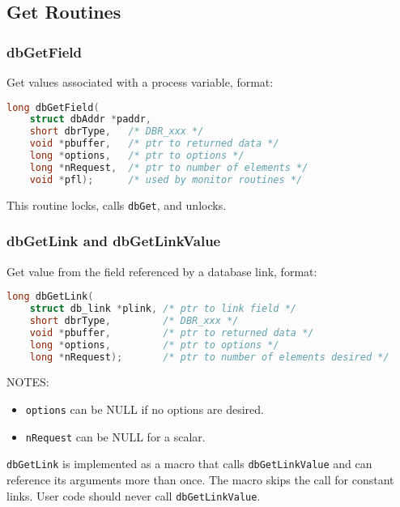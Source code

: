 \subsection{Get Routines}

\subsubsection{dbGetField}

Get values associated with a process variable, format:

\begin{lstlisting}[language=C]
long dbGetField(
    struct dbAddr *paddr,
    short dbrType,   /* DBR_xxx */
    void *pbuffer,   /* ptr to returned data */
    long *options,   /* ptr to options */
    long *nRequest,  /* ptr to number of elements */
    void *pfl);      /* used by monitor routines */
\end{lstlisting}

This routine locks, calls \verb|dbGet|, and unlocks.

\subsubsection{dbGetLink and dbGetLinkValue}

Get value from the field referenced by a database link, format:

\begin{lstlisting}[language=C]
long dbGetLink(
    struct db_link *plink, /* ptr to link field */
    short dbrType,         /* DBR_xxx */
    void *pbuffer,         /* ptr to returned data */
    long *options,         /* ptr to options */
    long *nRequest);       /* ptr to number of elements desired */
\end{lstlisting}

NOTES:

\begin{itemize}

\item \verb|options| can be NULL if no options are desired.

\item \verb|nRequest| can be NULL for a scalar.

\end{itemize}

\verb|dbGetLink| is implemented as a macro that calls \verb|dbGetLinkValue| and can reference its arguments more than once.
The macro skips the call for constant links.
User code should never call \verb|dbGetLinkValue|.

